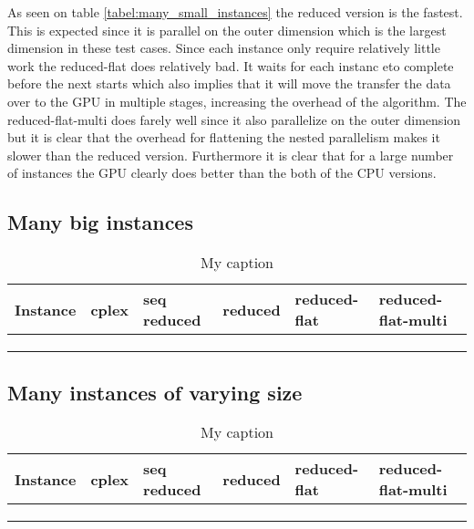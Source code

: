 
As seen on table \ref{tabel:many_small_instances} the reduced version is the fastest. This is expected since it is parallel on the outer dimension which is the largest dimension in these test cases. Since each instance only require relatively little work the reduced-flat does relatively bad. It waits for each instanc eto complete before the next starts which also implies that it will move the transfer the data over to the GPU in multiple stages, increasing the overhead of the algorithm. The reduced-flat-multi does farely well since it also parallelize on the outer dimension but it is clear that the overhead for flattening the nested parallelism makes it slower than the reduced version. Furthermore it is clear that for a large number of instances the GPU clearly does better than the both of the CPU versions.


\subsection{Many big instances}
\begin{table}[H]
	\centering
	\caption{My caption}
	\label{my-label}
	\begin{tabular}{|l|l|l|l|l|l|}\hline
		Instance & cplex & seq reduced & reduced & reduced-flat & reduced-flat-multi \\\hline
		&       &             &         &              &                    \\\hline
		&       &             &         &              &                    \\\hline
		&       &             &         &              &                   \\\hline
	\end{tabular}
\end{table}




\subsection{Many instances of varying size}
\begin{table}[H]
	\centering
	\caption{My caption}
	\label{my-label}
	\begin{tabular}{|l|l|l|l|l|l|}\hline
		Instance & cplex & seq reduced & reduced & reduced-flat & reduced-flat-multi \\\hline
		&       &             &         &              &                    \\\hline
		&       &             &         &              &                    \\\hline
		&       &             &         &              &                   \\\hline
	\end{tabular}
\end{table}


